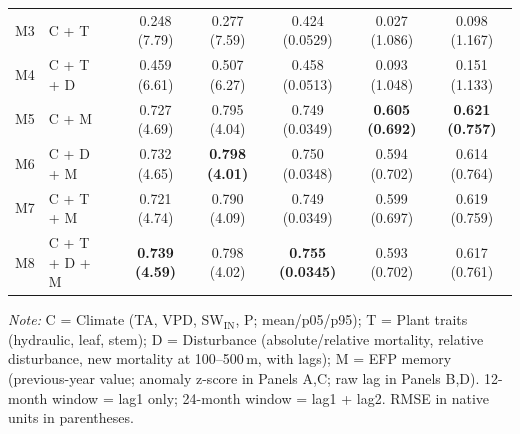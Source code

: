 \begin{table}[htbp]
\begin{tabular}{llcccccc}
M3 & C + T &  & 0.248 (7.79) & 0.277 (7.59) & 0.424 (0.0529) & 0.027 (1.086) & 0.098 (1.167) \\
M4 & C + T + D &  & 0.459 (6.61) & 0.507 (6.27) & 0.458 (0.0513) & 0.093 (1.048) & 0.151 (1.133) \\
M5 & C + M &  & 0.727 (4.69) & 0.795 (4.04) & 0.749 (0.0349) & \textbf{0.605 (0.692)} & \textbf{0.621 (0.757)} \\
M6 & C + D + M &  & 0.732 (4.65) & \textbf{0.798 (4.01)} & 0.750 (0.0348) & 0.594 (0.702) & 0.614 (0.764) \\
M7 & C + T + M &  & 0.721 (4.74) & 0.790 (4.09) & 0.749 (0.0349) & 0.599 (0.697) & 0.619 (0.759) \\
M8 & C + T + D + M &  & \textbf{0.739 (4.59)} & 0.798 (4.02) & \textbf{0.755 (0.0345)} & 0.593 (0.702) & 0.617 (0.761) \\
\midrule
\bottomrule
\end{tabular}
\vspace{2pt}
\begin{minipage}{\linewidth}
\footnotesize
\textit{Note:} C = Climate (TA, VPD, SW$_\mathrm{IN}$, P; mean/p05/p95); T = Plant traits (hydraulic, leaf, stem); D = Disturbance (absolute/relative mortality, relative disturbance, new mortality at 100--500\,m, with lags); M = EFP memory (previous-year value; anomaly z-score in Panels A,C; raw lag in Panels B,D). 12-month window = lag1 only; 24-month window = lag1 + lag2. RMSE in native units in parentheses.
\end{minipage}
\end{table}

